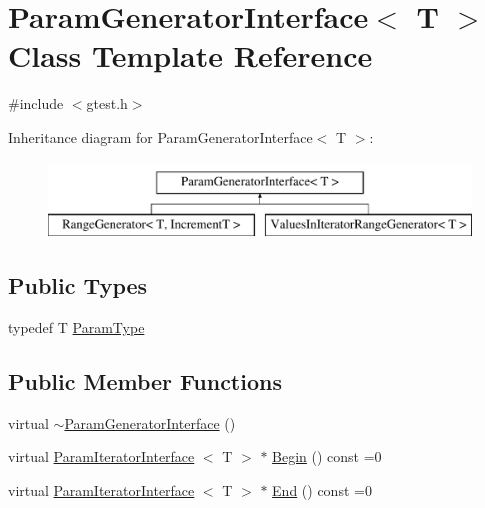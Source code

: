 \hypertarget{classtesting_1_1internal_1_1ParamGeneratorInterface}{\section{\-Param\-Generator\-Interface$<$ \-T $>$ \-Class \-Template \-Reference}
\label{d3/d4a/classtesting_1_1internal_1_1ParamGeneratorInterface}
}


{\ttfamily \#include $<$gtest.\-h$>$}

\-Inheritance diagram for \-Param\-Generator\-Interface$<$ \-T $>$\-:\begin{figure}[H]
\begin{center}
\leavevmode
\includegraphics[height=2.000000cm]{d3/d4a/classtesting_1_1internal_1_1ParamGeneratorInterface}
\end{center}
\end{figure}
\subsection*{\-Public \-Types}
\begin{DoxyCompactItemize}
\item 
typedef \-T \hyperlink{classtesting_1_1internal_1_1ParamGeneratorInterface_a1c17d95e5946c3f940ece2bd9165fc34}{\-Param\-Type}
\end{DoxyCompactItemize}
\subsection*{\-Public \-Member \-Functions}
\begin{DoxyCompactItemize}
\item 
virtual \hyperlink{classtesting_1_1internal_1_1ParamGeneratorInterface_a56e81ce7d67f3e9244dce00c9a4c3190}{$\sim$\-Param\-Generator\-Interface} ()
\item 
virtual \hyperlink{classtesting_1_1internal_1_1ParamIteratorInterface}{\-Param\-Iterator\-Interface}\*
$<$ \-T $>$ $\ast$ \hyperlink{classtesting_1_1internal_1_1ParamGeneratorInterface_acb0d400d056589f4c97de6e97154cec9}{\-Begin} () const =0
\item 
virtual \hyperlink{classtesting_1_1internal_1_1ParamIteratorInterface}{\-Param\-Iterator\-Interface}\*
$<$ \-T $>$ $\ast$ \hyperlink{classtesting_1_1internal_1_1ParamGeneratorInterface_a58359ba4a8712efe786c9bb712d24b93}{\-End} () const =0
\end{DoxyCompactItemize}


